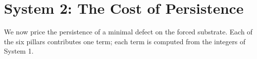 \section{System 2: The Cost of Persistence}
\label{sec:system2_geometric_impedance}

We now price the persistence of a minimal defect on the forced substrate. Each of the six pillars contributes one term; each term is computed from the integers of System 1.

